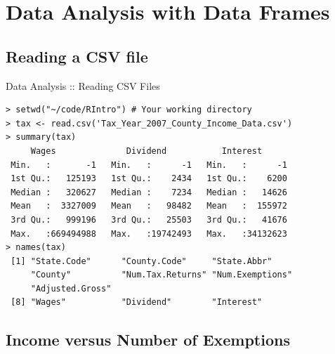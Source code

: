 \documentclass{beamer}
\begin{document}
\section{Data Analysis with Data Frames}

\subsection{Reading a CSV file}

\begin{frame}[fragile]{Data Analysis :: Reading CSV Files}

\begin{verbatim}
> setwd("~/code/RIntro") # Your working directory
> tax <- read.csv('Tax_Year_2007_County_Income_Data.csv')
> summary(tax)
     Wages              Dividend           Interest       
 Min.   :       -1   Min.   :      -1   Min.   :      -1  
 1st Qu.:   125193   1st Qu.:    2434   1st Qu.:    6200  
 Median :   320627   Median :    7234   Median :   14626  
 Mean   :  3327009   Mean   :   98482   Mean   :  155972  
 3rd Qu.:   999196   3rd Qu.:   25503   3rd Qu.:   41676  
 Max.   :669494988   Max.   :19742493   Max.   :34132623
> names(tax)
 [1] "State.Code"      "County.Code"     "State.Abbr"
     "County"          "Num.Tax.Returns" "Num.Exemptions"
     "Adjusted.Gross" 
 [8] "Wages"           "Dividend"        "Interest"       
\end{verbatim}

\end{frame}

\subsection{Income versus Number of Exemptions}
\end{document}

